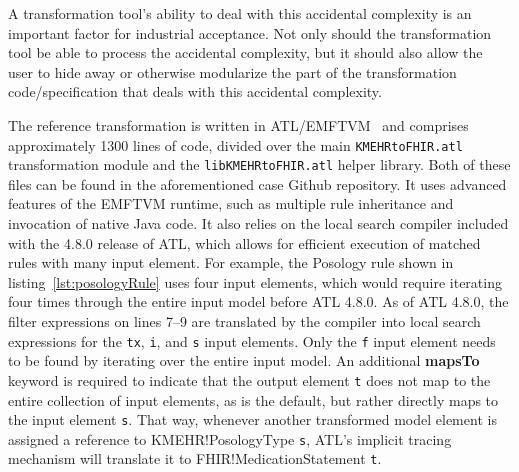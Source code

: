 \documentclass[
twocolumn,
]{ceurart}
\begin{document}
A transformation tool's ability to deal with this accidental complexity is an
important factor for industrial acceptance. Not only should the transformation
tool be able to process the accidental complexity, but it should also allow
the user to hide away or otherwise modularize the part of the transformation
code/specification that deals with this accidental complexity.

The reference transformation is written in ATL/EMFTVM~\cite{conf/models/Wagelaar2011}
and comprises approximately 1300 lines of code, divided over the main \texttt{KMEHRtoFHIR.atl}
transformation module and the \texttt{libKMEHRtoFHIR.atl} helper library. Both
of these files can be found in the aforementioned case Github repository. It uses
advanced features of the EMFTVM runtime, such as multiple rule inheritance and
invocation of native Java code. It also relies on the local search compiler
included with the 4.8.0 release of ATL, which allows for efficient
execution of matched rules with many input element. For example, the Posology
rule shown in listing~\ref{lst:posologyRule} uses four input elements, which would
require iterating four times through the entire input model before ATL 4.8.0.
As of ATL 4.8.0, the filter expressions on lines 7--9 are translated by the compiler
into local search expressions for the \texttt{tx}, \texttt{i}, and \texttt{s} input
elements. Only the \texttt{f} input element needs to be found by iterating over
the entire input model. An additional \textbf{mapsTo} keyword is required to
indicate that the output element \texttt{t} does not map to the entire collection
of input elements, as is the default, but rather directly maps to the input
element \texttt{s}. That way, whenever another transformed model element is
assigned a reference to KMEHR!PosologyType \texttt{s}, ATL's implicit tracing
mechanism will translate it to FHIR!MedicationStatement \texttt{t}.
\end{document}
